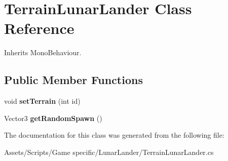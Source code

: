 \hypertarget{class_terrain_lunar_lander}{\section{Terrain\-Lunar\-Lander Class Reference}
\label{class_terrain_lunar_lander}
}


Inherits Mono\-Behaviour.

\subsection*{Public Member Functions}
\begin{DoxyCompactItemize}
\item 
\hypertarget{class_terrain_lunar_lander_acfc76c3bc507e0ed4fc49a988b1098d6}{void {\bfseries set\-Terrain} (int id)}\label{class_terrain_lunar_lander_acfc76c3bc507e0ed4fc49a988b1098d6}

\item 
\hypertarget{class_terrain_lunar_lander_a8e2a88dbf76bfaf61dd9e51666c88ade}{Vector3 {\bfseries get\-Random\-Spawn} ()}\label{class_terrain_lunar_lander_a8e2a88dbf76bfaf61dd9e51666c88ade}

\end{DoxyCompactItemize}


The documentation for this class was generated from the following file\-:\begin{DoxyCompactItemize}
\item 
Assets/\-Scripts/\-Game specific/\-Lunar\-Lander/Terrain\-Lunar\-Lander.\-cs\end{DoxyCompactItemize}
